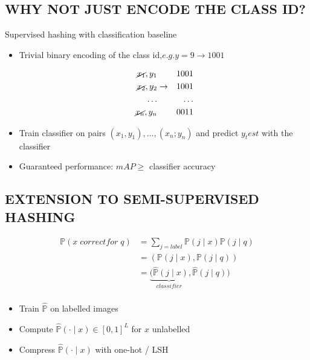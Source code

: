 \documentclass{article}
\begin{document}
\subsection{WHY NOT JUST ENCODE THE CLASS ID?}
Supervised hashing with classification baseline
\begin{itemize}
\item Trivial binary encoding of the class id,$ e.g. y=9 \rightarrow 1001$
\centering

\begin{eqnarray}
\cancel{x_1}, y_1  & & 1001    \\
\cancel{x_2}, y_2  & \rightarrow & 1001   \\
\dots  & & \dots \\
\cancel{x_n}, y_n  & & 0011
\end{eqnarray}
\item Train classifier on pairs $(x_1, y_1),  \dots ,(x_n; y_n)$ and predict $y_test$ with the classifier
\item Guaranteed performance: $mAP \geq$ classifier accuracy
\end{itemize}

\subsection{EXTENSION TO SEMI-SUPERVISED HASHING}
\begin{equation}
\begin{split}
    \mathbb{P}(x\;correct for\; q) & = \sum_{j=label} \mathbb{P}(j\mid x)\mathbb{P}(j\mid q)  \\
    &=(\mathbb{P}(j\mid x),\mathbb{P}(j\mid q))  \\
    &=\underbrace{(\hat{\mathbb{P}}(j\mid x)}_{classifier},\hat{\mathbb{P}}(j\mid q))  \\
\end{split}
\end{equation}
\begin{itemize}
    \item Train $\hat{\mathbb{P}}$ on labelled images
    \item Compute $\hat{\mathbb{P}}(\cdot\mid x) \in\left[0,1\right]^{L}$ for $x$ unlabelled
    \item Compress $\hat{\mathbb{P}}(\cdot\mid x)$ with one-hot / LSH
\end{itemize}
\end{document}

